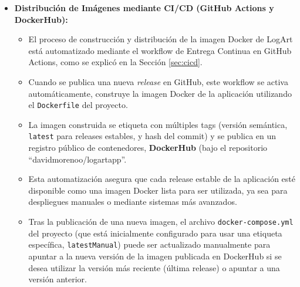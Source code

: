 \begin{itemize}
\begin{itemize}
        \item Configura las variables de entorno necesarias (cargadas desde un archivo \texttt{.env} para el servicio \texttt{app}), las redes para la comunicación entre contenedores, junto con los puertos expuestos.
        \item incluye \textit{healthchecks} para ambos servicios, asegurando un arranque ordenado y la correcta operatividad del sistema.
        \item Permite levantar todo el entorno con un simple comando (\texttt{docker-compose up}), lo que simplifica enormemente la configuración para cualquier desarrollador o para ejecutar la aplicación en un entorno de demostración. Las instrucciones detalladas para la ejecución se encuentran en el \texttt{README.md} del proyecto.
    \end{itemize}
    \vspace{0.3cm}
    \item \textbf{Distribución de Imágenes mediante CI/CD (GitHub Actions y DockerHub):}
    \begin{itemize}
        \item El proceso de construcción y distribución de la imagen Docker de LogArt está automatizado mediante el workflow de Entrega Continua en GitHub Actions, como se explicó en la Sección \ref{sec:cicd}.
        \item Cuando se publica una nueva \textit{release} en GitHub, este workflow se activa automáticamente, construye la imagen Docker de la aplicación utilizando el \texttt{Dockerfile} del proyecto.
        \item La imagen construida se etiqueta con múltiples tags (versión semántica, \texttt{latest} para releases estables, y hash del commit) y se publica en un registro público de contenedores, \textbf{DockerHub} (bajo el repositorio ``davidmorenoo/logartapp''.
        \item Esta automatización asegura que cada release estable de la aplicación esté disponible como una imagen Docker lista para ser utilizada, ya sea para despliegues manuales o mediante sistemas más avanzados.
        \item Tras la publicación de una nueva imagen, el archivo \texttt{docker-compose.yml} del proyecto (que está inicialmente configurado para usar una etiqueta específica, \texttt{latestManual}) puede ser actualizado manualmente para apuntar a la nueva versión de la imagen publicada en DockerHub si se desea utilizar la versión más reciente (última release) o apuntar a una versión anterior.

\end{itemize}
\end{itemize}

